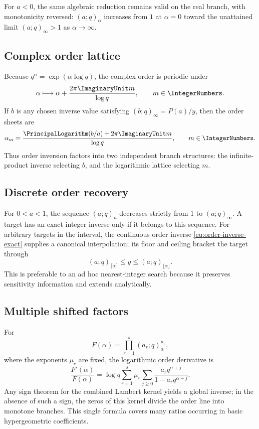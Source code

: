 \documentclass[11pt,oneside]{article}
\theoremstyle{definition}
\theoremstyle{remark}
\theoremstyle{plain}
\theoremstyle{definition}
\theoremstyle{remark}
\numberwithin{equation}{section}
\numberwithin{figure}{section}
\numberwithin{table}{section}
\let\reportsubsection\subsection
\let\reportsubsubsection\subsubsection
\let\section\reportsubsection
\let\subsection\reportsubsubsection
\begin{document}
For \(a<0\), the same algebraic reduction remains valid on the real branch,
with monotonicity reversed: \((a;q)_\alpha\) increases from \(1\) at
\(\alpha=0\) toward the unattained limit \((a;q)_\infty>1\) as
\(\alpha\to\infty\).

\section{Complex order lattice}
Because \(q^\alpha=\exp(\alpha\log q)\), the complex order is periodic under
\[
 \alpha\longmapsto\alpha+\frac{2\pi\ImaginaryUnit m}{\log q},
 \qquad m\in\IntegerNumbers.
\]
If \(b\) is any chosen inverse value satisfying
\((b;q)_\infty=P(a)/y\), then the order sheets are
\begin{equation}
 \alpha_m=
 \frac{\PrincipalLogarithm(b/a)+2\pi\ImaginaryUnit m}{\log q},
 \qquad m\in\IntegerNumbers.
 \label{eq:complex-order-lattice}
\end{equation}
Thus order inversion factors into two independent branch structures: the
infinite-product inverse selecting \(b\), and the logarithmic lattice selecting
\(m\).

\section{Discrete order recovery}
For \(0<a<1\), the sequence \((a;q)_n\) decreases strictly from \(1\) to
\((a;q)_\infty\).  A target has an exact integer inverse only if it belongs to
this sequence.  For arbitrary targets in the interval, the continuous order
inverse \eqref{eq:order-inverse-exact} supplies a canonical interpolation; its
floor and ceiling bracket the target through
\[
 (a;q)_{\lceil\alpha\rceil}
 \le y\le
 (a;q)_{\lfloor\alpha\rfloor}.
\]
This is preferable to an ad hoc nearest-integer search because it preserves
sensitivity information and extends analytically.

\section{Multiple shifted factors}
For
\[
 F(\alpha)=\prod_{r=1}^s(a_r;q)_\alpha^{\mu_r},
\]
where the exponents \(\mu_r\) are fixed, the logarithmic order derivative is
\[
 \frac{F'(\alpha)}{F(\alpha)}
 =\log q\sum_{r=1}^s\mu_r
 \sum_{j\ge0}\frac{a_rq^{\alpha+j}}{1-a_rq^{\alpha+j}}.
\]
Any sign theorem for the combined Lambert kernel yields a global inverse; in
the absence of such a sign, the zeros of this kernel divide the order line into
monotone branches.  This single formula covers many ratios occurring in basic
hypergeometric coefficients.
\end{document}
